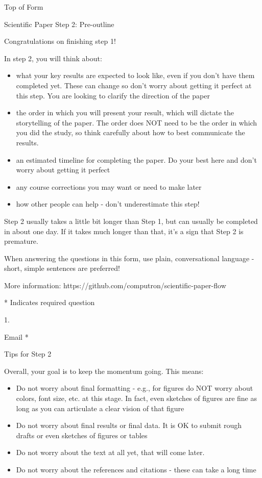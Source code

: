 \documentclass[]{article}
\date{}
\begin{document}
Top of Form

Scientific Paper Step 2: Pre-outline

Congratulations on finishing step 1!

In step 2, you will think about:

\begin{itemize}
\item
  what your key results are expected to look like, even if you don't
  have them completed yet. These can change so don't worry about getting
  it perfect at this step. You are looking to clarify the direction of
  the paper
\item
  the order in which you will present your result, which will dictate
  the storytelling of the paper. The order does NOT need to be the order
  in which you did the study, so think carefully about how to best
  communicate the results.
\item
  an estimated timeline for completing the paper. Do your best here and
  don't worry about getting it perfect
\item
  any course corrections you may want or need to make later
\item
  how other people can help - don't underestimate this step!
\end{itemize}

Step 2 usually takes a little bit longer than Step 1, but can usually be
completed in about one day. If it takes much longer than that, it's a
sign that Step 2 is premature.

When answering the questions in this form, use plain, conversational
language - short, simple sentences are preferred!

More information: https://github.com/computron/scientific-paper-flow

* Indicates required question

1.

Email *

Tips for Step 2

Overall, your goal is to keep the momentum going. This means:

\begin{itemize}
\item
  Do not worry about final formatting - e.g., for figures do NOT worry
  about colors, font size, etc. at this stage. In fact, even sketches of
  figures are fine as long as you can articulate a clear vision of that
  figure
\item
  Do not worry about final results or final data. It is OK to submit
  rough drafts or even sketches of figures or tables
\item
  Do not worry about the text at all yet, that will come later.
\item
  Do not worry about the references and citations - these can take a
  long time
\end{itemize}
\end{document}
